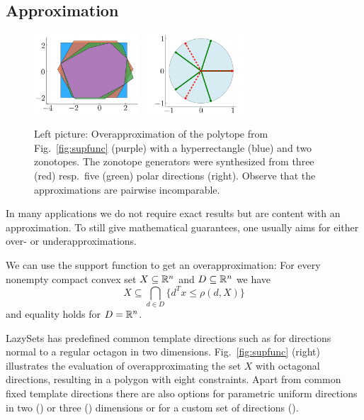 \subsection{Approximation}

\begin{figure}
	\hfill
	\includegraphics[height=30mm]{img/overapproximate}
	\hfill
	\includegraphics[height=30mm]{img/polardirs}
	\hfill\
	\vspace*{1mm}
	\caption{Left picture: Overapproximation of the polytope from Fig.~\ref{fig:supfunc} (purple) with a hyperrectangle (blue) and two zonotopes. The zonotope generators were synthesized from three (red) resp.\ five (green) polar directions (right). Observe that the approximations are pairwise incomparable.}
	\label{fig:overapproximate}
\end{figure}

In many applications we do not require exact results but are content with an approximation. To still give mathematical guarantees, one usually aims for either over- or underapproximations.

We can use the support function to get an overapproximation: For every nonempty compact convex set $X \subseteq \mathbb{R}^n$ and $D \subseteq \mathbb{R}^n$ we have
\begin{equation*}
	X \subseteq \bigcap_{d \in D} \{d^T x \leq \rho(d, X)\}
\end{equation*}
and equality holds for $D = \mathbb{R}^n$.

\smallskip

LazySets has predefined common template directions such as  for directions normal to a regular octagon in two dimensions. Fig.~\ref{fig:supfunc} (right) illustrates the evaluation of overapproximating the set $X$ with octagonal directions, resulting in a polygon with eight constraints. Apart from common fixed template directions there are also options for parametric uniform directions in two () or three () dimensions or for a custom set of directions ().

